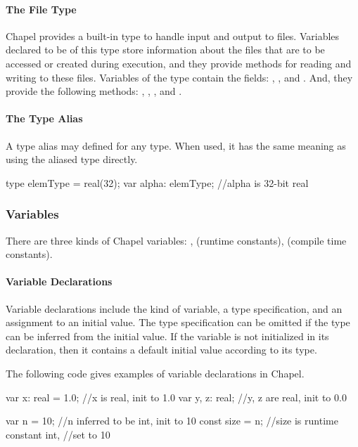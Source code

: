 \paragraph{The File Type}
Chapel provides a built-in  type to handle input and
output to files.  Variables declared to be of this type store
information about the files that are to be accessed or created during
execution, and they provide methods for reading and writing to these
files.  Variables of the  type contain the
fields:  , , and .
And, they provide the following methods:
, , ,  and .

\paragraph{The Type Alias}
A type alias may defined for any type.  When used, it has the
same meaning as using the aliased type directly.
\begin{chapel}
type elemType = real(32);
var alpha: elemType; //alpha is 32-bit real
\end{chapel}

\subsubsection{Variables}
There are three kinds of Chapel variables: ,
 (runtime constants),  (compile time constants).

\paragraph{Variable Declarations}
Variable declarations include the kind of variable, a type specification,
and an assignment to an initial value.  The type specification can be
omitted if the type can be inferred from the initial value.  If the
variable is not initialized in its declaration, then it contains a
default initial value according to its type.

\begin{example}
The following code gives examples of variable declarations in Chapel. 
\begin{chapel}
var x: real = 1.0; //x is real, init to 1.0
var y, z: real; //y, z are real, init to 0.0

var n = 10; //n inferred to be int, init to 10
const size = n; //size is runtime constant int,
                //set to 10
\end{chapel}
\end{example}

